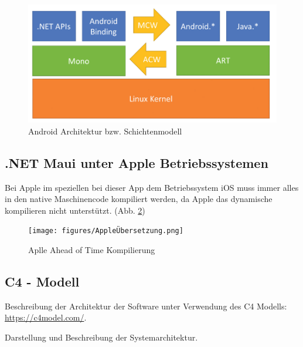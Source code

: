 \begin{figure}[H]
	\centering
	\includegraphics[width=\textwidth,height=\textheight,keepaspectratio]{figures/AndroidArchitektur.png}
	\caption{Android Architektur bzw. Schichtenmodell}
	\label{fig:AndroidArchitektur}
\end{figure}

\subsection{.NET Maui unter Apple Betriebssystemen}
Bei Apple im speziellen bei dieser App dem Betriebssystem iOS muss immer alles in den native Maschinencode kompiliert werden, da Apple das dynamische kompilieren nicht unterstützt. (Abb. \ref{fig:AppleÜbersetzung})

\begin{figure}[H]
	\centering
	\texttt{[image: figures/AppleÜbersetzung.png]}
	\caption{Aplle Ahead of Time Kompilierung}
	\label{fig:AppleÜbersetzung}
\end{figure}







\subsection{C4 - Modell}

Beschreibung der Architektur der Software unter Verwendung des C4 Modells: \url{https://c4model.com/}.

Darstellung und Beschreibung der Systemarchitektur.


